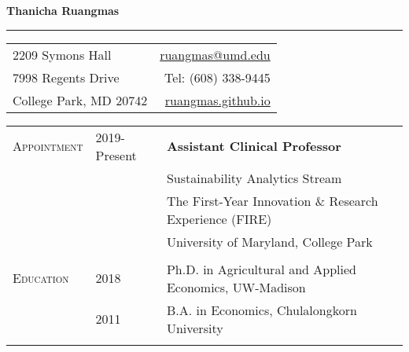 \documentclass[letterpaper,11pt,oneside]{article}\usepackage[]{graphicx}\usepackage[]{xcolor}
\newcommand{\link}[1]{{\color{blue}\href{#1}{#1}}}
\begin{document}

\noindent  \LARGE{\textbf{Thanicha Ruangmas}}  \\
\noindent\rule{\textwidth}{1pt}
\normalsize 

\vspace{1em}
\noindent \begin{tabular}{p{2.1in} r}
2209 Symons Hall            & \hspace{3.5in} \link{ruangmas@umd.edu} \\
7998 Regents Drive          & \hspace{3.5in} Tel: (608) 338-9445 \\
College Park, MD 20742      & \hspace{3.5in} \link{ruangmas.github.io} \\
\end{tabular}

\vspace{2em}


\noindent \begin{tabular}{p{1.2in} p{0.9in} l}

\textsc{Appointment}    & 2019-Present & \textbf{Assistant Clinical Professor} \\
                        &       & Sustainability Analytics Stream \\
                        &       & The First-Year Innovation \& Research Experience (FIRE) \\
                        &       & University of Maryland, College Park \\
                        &       &  \\                        
\textsc{Education}      & 2018 & Ph.D. in Agricultural and Applied Economics, UW-Madison \\
                        & 2011 & B.A. in Economics, Chulalongkorn University \\
                        &       &  \\  
\end{tabular}
\end{document}

